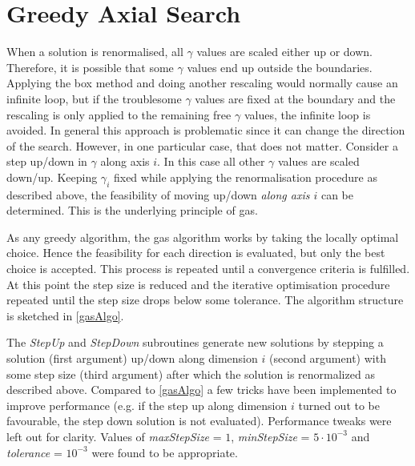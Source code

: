 \documentclass[a4paper, 5p, sort&compress]{elsarticle}%
\begin{document}


\appendix

\renewcommand{\thesection}{Appendix \Roman{section}}
\section{Greedy Axial Search}
\label{sec:greedy-axial-search}

When a solution is renormalised, all $\gamma$ values are scaled either up
or down. Therefore, it is possible that some $\gamma$ values end up outside
the boundaries. Applying the box method and doing another rescaling
would normally cause an infinite loop, but if the troublesome $\gamma$
values are fixed at the boundary and the rescaling is only applied to
the remaining free $\gamma$ values, the infinite loop is avoided. In
general this approach is problematic since it can change the direction
of the search. However, in one particular case, that does not
matter. Consider a step up/down in $\gamma$ along axis $i$. In this case
all other $\gamma$ values are scaled down/up. Keeping $\gamma_{i}$ fixed while
applying the renormalisation procedure as described above, the
feasibility of moving up/down \textit{along axis $i$} can be
determined. This is the underlying principle of \gls{gas}.

As any greedy algorithm, the \gls{gas} algorithm works by taking the
locally optimal choice. Hence the feasibility for each direction is
evaluated, but only the best choice is accepted. This process is
repeated until a convergence criteria is fulfilled. At this point the
step size is reduced and the iterative optimisation procedure repeated
until the step size drops below some tolerance. The algorithm
structure is sketched in \cref{gasAlgo}.

The \textit{StepUp} and \textit{StepDown} subroutines generate new
solutions by stepping a solution (first argument) up/down along
dimension $i$ (second argument) with some step size (third argument)
after which the solution is renormalized as described above. Compared
to \cref{gasAlgo} a few tricks have been implemented to improve
performance (e.g. if the step up along dimension $i$ turned out to be
favourable, the step down solution is not evaluated). Performance
tweaks were left out for clarity. Values of \textit{maxStepSize} =
$1$, \textit{minStepSize} = $5 \cdot 10^{-3}$ and \textit{tolerance} =
$10^{-3}$ were found to be appropriate.
\end{document}
